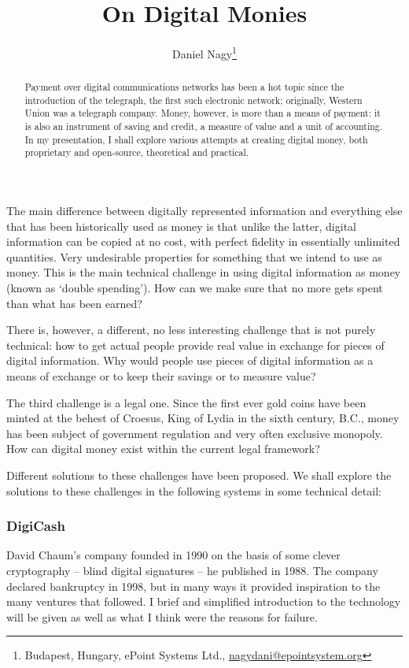 \documentclass[10pt, a5paper]{article}
\begin{document}
\title{On Digital Monies}

\author{Daniel Nagy\footnote{Budapest, Hungary, ePoint Systems Ltd., \url{nagydani@epointsystem.org}}}
\date{}
\maketitle
\renewcommand{\abstractname}{Abstract}
\begin{abstract}
Payment over digital communications networks has been a hot topic since
the introduction of the telegraph, the first such electronic network;
originally, Western Union was a telegraph company. Money, however, is
more than a means of payment: it is also an instrument of saving and
credit, a measure of value and a unit of accounting. In my presentation,
I shall explore various attempts at creating digital money, both
proprietary and open-source, theoretical and practical.
\end{abstract}

The main difference between digitally represented information and
everything else that has been historically used as money is that unlike
the latter, digital information can be copied at no cost, with perfect
fidelity in essentially unlimited quantities. Very undesirable
properties for something that we intend to use as money. This is the
main technical challenge in using digital information as money (known as
`double spending'). How can we make sure that no more gets spent than
what has been earned?

There is, however, a different, no less interesting challenge that is
not purely technical: how to get actual people provide real value in
exchange for pieces of digital information. Why would people use pieces
of digital information as a means of exchange or to keep their savings
or to measure value?

The third challenge is a legal one. Since the first ever gold coins have
been minted at the behest of Croesus, King of Lydia in the sixth
century, B.C., money has been subject of government regulation and very
often exclusive monopoly. How can digital money exist within the current
legal framework?

Different solutions to these challenges have been proposed. We shall
explore the solutions to these challenges in the following systems in
some technical detail:

\subsubsection*{DigiCash}
David Chaum's company founded in 1990 on the basis of some clever
cryptography -- blind digital signatures -- he published in 1988. The
company declared bankruptcy in 1998, but in many ways it provided
inspiration to the many ventures that followed. I brief and simplified
introduction to the technology will be given as well as what I think
were the reasons for failure.
\end{document}
